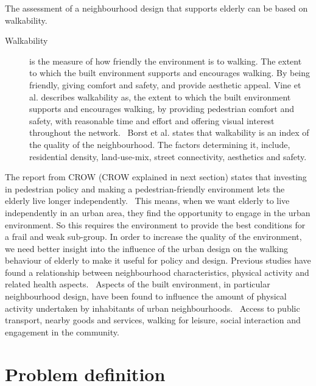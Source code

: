 The assessment of a neighbourhood design that supports elderly can be based on walkability. \begin{description}\item[Walkability] is the measure of how friendly the environment is to walking. The extent to which the built environment supports and encourages walking. By being friendly, giving comfort and safety, and provide aesthetic appeal. 
Vine et al. describes walkability as, the extent to which the built environment supports and encourages walking, by providing pedestrian comfort and safety, with reasonable time and effort and offering visual interest throughout the network.~\cite{Vine2012} Borst et al. states that walkability is an index of the quality of the neighbourhood. The factors determining it, include, residential density, land-use-mix, street connectivity, aesthetics and safety.~\cite{Borst2008} \end{description}

The report from CROW (CROW explained in next section) states that investing in pedestrian policy  and making a pedestrian-friendly environment lets the elderly live longer independently.~\cite{Eijnde2011, Crow2014} This means, when we want elderly to live independently in an urban area, they find the opportunity to engage in the urban environment. So this requires the environment to provide the best conditions for a frail and weak sub-group.
In order to increase the quality of the environment, we need better insight into the influence of the urban design on the walking behaviour of elderly to make it useful for policy and design. Previous studies have found a relationship between neighbourhood characteristics, physical activity and related health aspects.~\cite{Borst2008} 
Aspects of the built environment, in particular neighbourhood design, have been found to influence the amount of physical activity undertaken by inhabitants of urban neighbourhoods.~\cite{Borst2008} Access to public transport, nearby goods and services, walking for leisure, social interaction and engagement in the community.~\cite{Vine2012}

\section{Problem definition}
